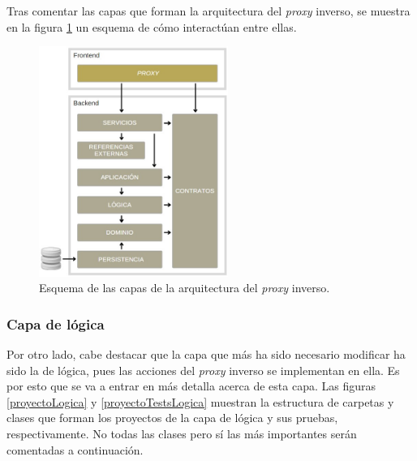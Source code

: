 \documentclass[11pt,spanish,listoffigures]{tfgetsinf}
\begin{document}
Tras comentar las capas que forman la arquitectura del \emph{proxy} inverso, se muestra en la figura \ref{arquitectura} un esquema de cómo interactúan entre ellas.


\begin{figure}[ht]
\centering
\includegraphics[width=0.55\textwidth]{imagenes/arquitectura}
\caption{Esquema de las capas de la arquitectura del \emph{proxy} inverso.}
	\label{arquitectura}
\end{figure}


			\subsubsection{Capa de lógica}

Por otro lado, cabe destacar que la capa que más ha sido necesario modificar ha sido la de lógica, pues las acciones del \emph{proxy} inverso se implementan en ella. Es por esto que se va a entrar en más detalla acerca de esta capa. Las figuras \ref{proyectoLogica} y \ref{proyectoTestsLogica} muestran la estructura de carpetas y clases que forman los proyectos de la capa de lógica y sus pruebas, respectivamente. No todas las clases pero sí las más importantes serán comentadas a continuación.

\end{document}
